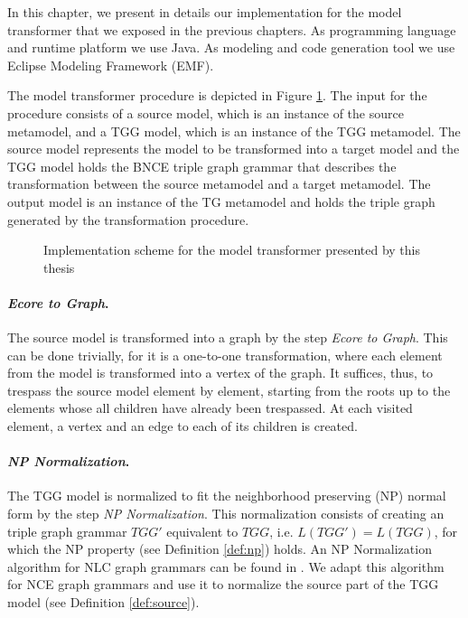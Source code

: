 In this chapter, we present in details our implementation for the model transformer that we exposed in the previous chapters. As programming language and runtime platform we use Java. As modeling and code generation tool we use Eclipse Modeling Framework (EMF).


The model transformer procedure is depicted in Figure \ref{fig:implementation-scheme}. The input for the procedure consists of a source model, which is an instance of the source metamodel, and a TGG model, which is an instance of the TGG metamodel. The source model represents the model to be transformed into a target model and the TGG model holds the BNCE triple graph grammar that describes the transformation between the source metamodel and a target metamodel. The output model is an instance of the TG metamodel and holds the triple graph generated by the transformation procedure.

\begin{figure}[h]
	
	\caption{Implementation scheme for the model transformer presented by this thesis}
	\label{fig:implementation-scheme}
\end{figure}

\paragraph*{\textit{Ecore to Graph}.} The source model is transformed into a graph by the step \textit{Ecore to Graph}. This can be done trivially, for it is a one-to-one transformation, where each element from the model is transformed into a vertex of the graph. It suffices, thus, to trespass the source model element by element, starting from the roots up to the elements whose all children have already been trespassed. At each visited element, a vertex and an edge to each of its children is created.

\paragraph*{\textit{NP Normalization}.} The TGG model is normalized to fit the neighborhood preserving (NP) normal form by the step \textit{NP Normalization}. This normalization consists of creating an triple graph grammar $TGG'$ equivalent to $TGG$, i.e. $L(TGG') = L(TGG)$, for which the NP property (see Definition \ref{def:np}) holds. An NP Normalization algorithm for NLC graph grammars can be found in \citep{rozenberg1986boundary}. We adapt this algorithm for NCE graph grammars and use it to normalize the source part of the TGG model (see Definition \ref{def:source}).

